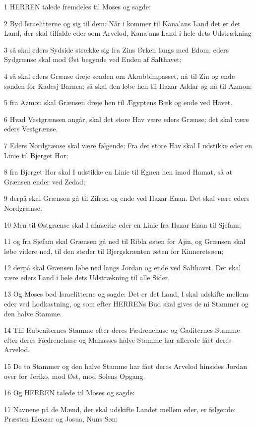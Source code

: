 \par 1 HERREN talede fremdeles til Moses og sagde:
\par 2 Byd Israelitterne og sig til dem: Når i kommer til Kana'ans Land det er det Land, der skal tilfalde eder som Arvelod, Kana'ans Land i hele dets Udstrækning
\par 3 så skal eders Sydside strække sig fra Zins Ørken langs med Edom; eders Sydgrænse skal mod Øst begynde ved Enden af Salthavet;
\par 4 så skal eders Grænse dreje sønden om Akrabbimpasset, nå til Zin og ende sønden for Kadesj Barnea; så skal den løbe hen til Hazar Addar øg nå til Azmon;
\par 5 fra Azmon skal Grænsen dreje hen til Ægyptens Bæk og ende ved Havet.
\par 6 Hvad Vestgrænsen angår, skal det store Hav være eders Grænse; det skal være eders Vestgrænse.
\par 7 Eders Nordgrænse skal være følgende: Fra det store Hav skal I udstikke eder en Linie til Bjerget Hor;
\par 8 fra Bjerget Hor skal I udstikke en Linie til Egnen hen imod Hamat, så at Grænsen ender ved Zedad;
\par 9 derpå skal Grænsen gå til Zifron og ende ved Hazar Enan. Det skal være eders Nordgrænse.
\par 10 Men til Østgrænse skal I afmærke eder en Linie fra Hazar Enan til Sjefam;
\par 11 og fra Sjefam skal Grænsen gå ned til Ribla østen for Ajin, og Grænsen skal løbe videre ned, til den støder til Bjergskrænten østen for Kinneretsøen;
\par 12 derpå skal Grænsen løbe ned langs Jordan og ende ved Salthavet. Det skal være eders Land i hele dets Udstrækning til alle Sider.
\par 13 Og Moses bød Israelitterne og sagde: Det er det Land, I skal udskifte mellem eder ved Lodkastning, og som efter HERRENs Bud skal gives de ni Stammer og den halve Stamme.
\par 14 Thi Rubeniternes Stamme efter deres Fædrenehuse og Gaditernes Stamme efter deres Fædrenehuse og Manasses halve Stamme har allerede fået deres Arvelod.
\par 15 De to Stammer og den halve Stamme har fået deres Arvelod hinsides Jordan over for Jeriko, mod Øst, mod Solens Opgang.
\par 16 Og HERREN talede til Moses og sagde:
\par 17 Navnene på de Mænd, der skal udskifte Landet mellem eder, er følgende: Præsten Eleazar og Josua, Nuns Søn;

